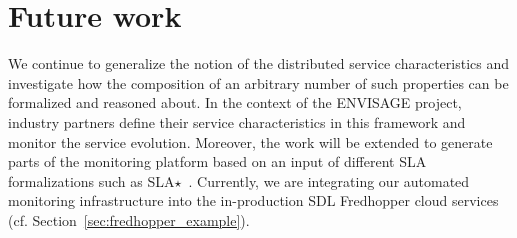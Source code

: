 
\section{Future work}
\label{sec:conclusion}




We continue to generalize the notion of the distributed service characteristics and investigate how the composition of an arbitrary number of such properties can be formalized and reasoned about.
In the context of the ENVISAGE project, industry partners define their service characteristics in this framework and monitor the service evolution.
Moreover, the work will be extended to generate parts of the monitoring platform based on an input of different SLA formalizations such as SLA$\star$~\cite{kearney2010sla}.
Currently, we are integrating our automated monitoring infrastructure
into the in-production SDL Fredhopper cloud services (cf. Section~\ref{sec:fredhopper_example}).
